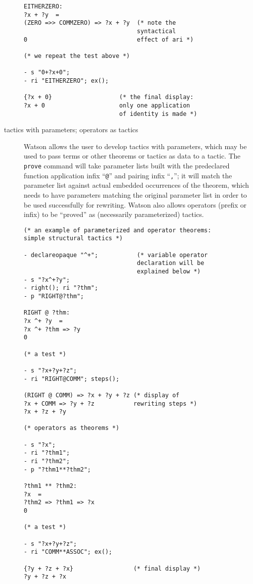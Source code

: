 \documentclass{kluwer}
\begin{document}
\begin{article}
\begin{description}
\begin{verbatim}
EITHERZERO:  
?x + ?y  =  
(ZERO =>> COMMZERO) => ?x + ?y  (* note the 
                                syntactical 
0                               effect of ari *)

(* we repeat the test above *)

- s "0+?x+0";
- ri "EITHERZERO"; ex();

{?x + 0}                   (* the final display:  
?x + 0                     only one application 
                           of identity is made *)
\end{verbatim}

\item[tactics with parameters; operators as tactics] Watson allows the
user to develop tactics with parameters, which may be used to pass
terms or other theorems or tactics as data to a tactic.  The {\tt
prove} command will take parameter lists built with the predeclared
function application infix ``{\tt @}'' and pairing infix ``{\tt ,}'';
it will match the parameter list against actual embedded occurrences
of the theorem, which needs to have parameters matching the original
parameter list in order to be used successfully for rewriting.  Watson
also allows operators (prefix or infix) to be ``proved'' as (necessarily
parameterized) tactics.

\begin{verbatim}
(* an example of parameterized and operator theorems:
simple structural tactics *)

- declareopaque "^+";           (* variable operator 
                                declaration will be
                                explained below *)
- s "?x^+?y";
- right(); ri "?thm";
- p "RIGHT@?thm";

RIGHT @ ?thm:  
?x ^+ ?y  =  
?x ^+ ?thm => ?y
0

(* a test *)

- s "?x+?y+?z";
- ri "RIGHT@COMM"; steps();

(RIGHT @ COMM) => ?x + ?y + ?z (* display of
?x + COMM => ?y + ?z           rewriting steps *)
?x + ?z + ?y

(* operators as theorems *)

- s "?x";
- ri "?thm1";
- ri "?thm2";
- p "?thm1**?thm2";

?thm1 ** ?thm2:  
?x  =  
?thm2 => ?thm1 => ?x
0

(* a test *)

- s "?x+?y+?z";
- ri "COMM**ASSOC"; ex();

{?y + ?z + ?x}                 (* final display *)
?y + ?z + ?x
\end{verbatim}  


\end{description}
\end{article}
\end{document}
